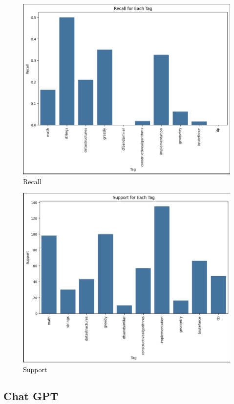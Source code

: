 \documentclass{article}
\begin{document}
\begin{figure}[H]
    \centering
    \includegraphics[scale=0.49]{imgs/recallknn.png}
    \caption{Recall}
    \label{fig:r}
\end{figure}
\begin{figure}[H]
    \centering
    \includegraphics[scale=0.49]{imgs/supportkn.png}
    \caption{Support}
    \label{fig:s}
\end{figure}

\subsection{Chat GPT}
\end{document}
